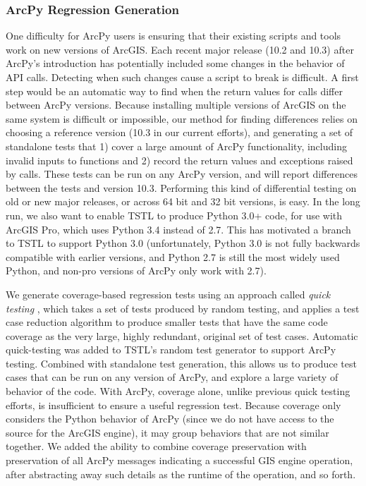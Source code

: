 \subsubsection{ArcPy Regression Generation}

One difficulty for ArcPy users is ensuring that their existing scripts
and tools work on new versions of ArcGIS.  Each recent major release
(10.2 and 10.3) after ArcPy's introduction has potentially included some changes
in the behavior of API calls.  Detecting when such changes cause a
script to break is difficult.  A first step would be an automatic way
to find when the return values for calls differ between ArcPy
versions.
Because installing multiple versions of ArcGIS on the same system is
difficult or impossible, our method for finding differences relies on
choosing a reference version (10.3 in our current efforts), and
generating a set of standalone tests that 1) cover a large amount of
ArcPy functionality, including invalid inputs to functions and 2)
record the return values and exceptions raised by calls.  These tests
can be run on any ArcPy version, and will report differences between
the tests and version 10.3.  Performing this kind of differential
testing \cite{Differential} on old or new major releases, or across 64
bit and 32 bit versions, is easy.  In the long run, we also want to
enable TSTL to produce Python 3.0+ code, for use with ArcGIS Pro,
which uses Python 3.4 instead of 2.7.  This has motivated a branch to
TSTL to support Python 3.0 (unfortunately, Python 3.0 is not fully
backwards compatible with earlier versions, and Python 2.7 is still
the most widely used Python, and non-pro versions of ArcPy only work
with 2.7).

We generate coverage-based regression tests using an approach called \emph{quick
  testing} \cite{icst14,stvrcausereduce}, which takes a set of tests
produced by random testing, and applies a test case reduction
algorithm \cite{DD} to produce smaller tests that have the same code
coverage as the very large, highly redundant, original set of test
cases.  Automatic quick-testing was added to TSTL's random test
generator to support ArcPy testing.  Combined with standalone test
generation, this allows us to produce test cases that can be run on
any version of ArcPy, and explore a large variety of behavior of the
code.  With ArcPy, coverage alone, unlike previous quick testing
efforts, is insufficient to ensure a useful regression test.  Because
coverage only considers the Python behavior of ArcPy (since we do not
have access to the source for the ArcGIS engine), it may group
behaviors that are not similar together.  We added the ability to
combine coverage preservation with preservation of all ArcPy messages
indicating a successful GIS engine operation, after abstracting away
such details as the runtime of the operation, and so forth.

